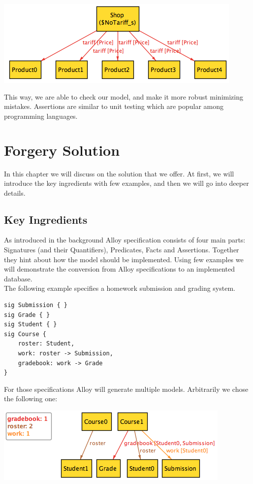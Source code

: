 \documentclass[oneside]{book}
\begin{document}
\begin{center}
\includegraphics[scale=0.6]{counterexample1}
\end{center}

This way, we are able to check our model, and make it more robust minimizing mistakes. Assertions are similar to unit testing which are popular among programming languages.

\newpage

\chapter{Forgery Solution}
In this chapter we will discuss on the solution that we offer. At first, we will introduce the key ingredients with few examples, and then we will go into deeper details.

\section{Key Ingredients}

As introduced in the background Alloy specification consists of four main parts: Signatures (and their Quantifiers), Predicates, Facts and Assertions. Together they hint about how the model should be implemented. Using few examples we will demonstrate the conversion from Alloy specifications to an implemented database.\\

The following example specifies a homework submission and grading system. 

\begin{lstlisting}
sig Submission { } 
sig Grade { }
sig Student { }
sig Course {
	roster: Student,
	work: roster -> Submission,
	gradebook: work -> Grade
}
\end{lstlisting}

For those specifications Alloy will generate multiple models. Arbitrarily we chose the following one:\\

\begin{center}
\includegraphics[scale=0.6]{overview1}
\end{center}
\end{document}
